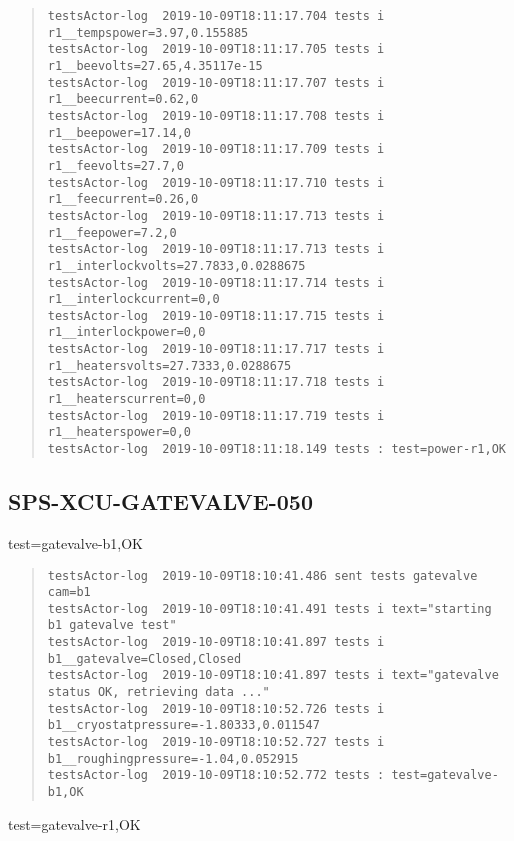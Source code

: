 \begin{quote}
\begin{tiny}
\begin{verbatim}
testsActor-log  2019-10-09T18:11:17.704 tests i r1__tempspower=3.97,0.155885
testsActor-log  2019-10-09T18:11:17.705 tests i r1__beevolts=27.65,4.35117e-15
testsActor-log  2019-10-09T18:11:17.707 tests i r1__beecurrent=0.62,0
testsActor-log  2019-10-09T18:11:17.708 tests i r1__beepower=17.14,0
testsActor-log  2019-10-09T18:11:17.709 tests i r1__feevolts=27.7,0
testsActor-log  2019-10-09T18:11:17.710 tests i r1__feecurrent=0.26,0
testsActor-log  2019-10-09T18:11:17.713 tests i r1__feepower=7.2,0
testsActor-log  2019-10-09T18:11:17.713 tests i r1__interlockvolts=27.7833,0.0288675
testsActor-log  2019-10-09T18:11:17.714 tests i r1__interlockcurrent=0,0
testsActor-log  2019-10-09T18:11:17.715 tests i r1__interlockpower=0,0
testsActor-log  2019-10-09T18:11:17.717 tests i r1__heatersvolts=27.7333,0.0288675
testsActor-log  2019-10-09T18:11:17.718 tests i r1__heaterscurrent=0,0
testsActor-log  2019-10-09T18:11:17.719 tests i r1__heaterspower=0,0
testsActor-log  2019-10-09T18:11:18.149 tests : test=power-r1,OK
\end{verbatim}
\end{tiny}
\end{quote}

\subsection{SPS-XCU-GATEVALVE-050}
\label{sec:tc-050}

test=gatevalve-b1,OK

\begin{quote}
\begin{tiny}
\begin{verbatim}
testsActor-log  2019-10-09T18:10:41.486 sent tests gatevalve cam=b1
testsActor-log  2019-10-09T18:10:41.491 tests i text="starting b1 gatevalve test"
testsActor-log  2019-10-09T18:10:41.897 tests i b1__gatevalve=Closed,Closed
testsActor-log  2019-10-09T18:10:41.897 tests i text="gatevalve status OK, retrieving data ..."
testsActor-log  2019-10-09T18:10:52.726 tests i b1__cryostatpressure=-1.80333,0.011547
testsActor-log  2019-10-09T18:10:52.727 tests i b1__roughingpressure=-1.04,0.052915
testsActor-log  2019-10-09T18:10:52.772 tests : test=gatevalve-b1,OK
\end{verbatim}
\end{tiny}
\end{quote}

\noindent test=gatevalve-r1,OK

